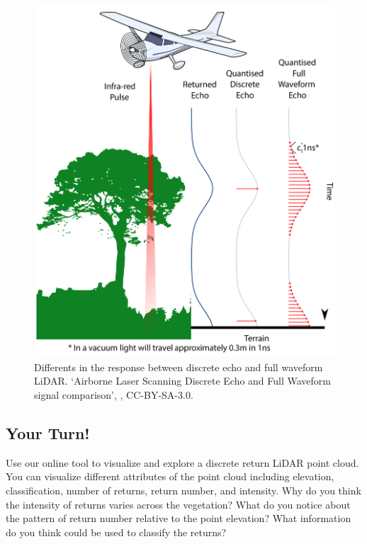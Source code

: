\documentclass[
]{book}
\begin{document}
\begin{figure}
\includegraphics[width=0.75\linewidth]{images/15-LiDAR-Discrete-Full-Waveform} \caption{Differents in the response between discrete echo and full waveform LiDAR. `Airborne Laser Scanning Discrete Echo and Full Waveform signal comparison', \citep{beck_airborne_2012}, CC-BY-SA-3.0.}\label{fig:15-LiDAR-Discrete-Full-Waveform}
\end{figure}

\subsection*{Your Turn!}\label{your-turn-5}

Use our online tool to visualize and explore a discrete return LiDAR point cloud. You can visualize different attributes of the point cloud including elevation, classification, number of returns, return number, and intensity. Why do you think the intensity of returns varies across the vegetation? What do you notice about the pattern of return number relative to the point elevation? What information do you think could be used to classify the returns?
\end{document}

